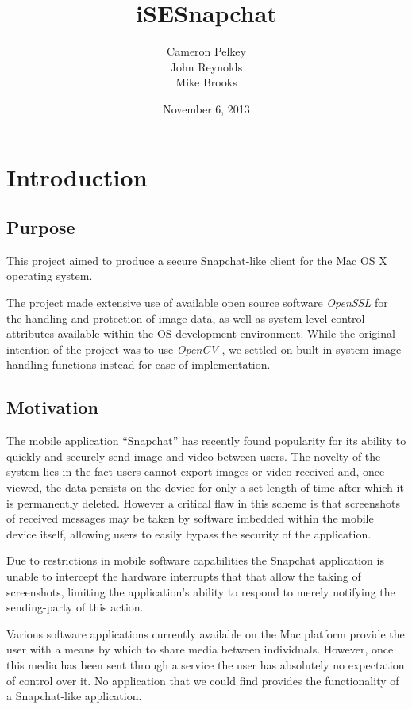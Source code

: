 \documentclass[11pt, a4paper,titlepage]{report}
\title{iSESnapchat}
\author{Cameron Pelkey\\John Reynolds\\Mike Brooks}
\date{November 6, 2013}
\begin{document}
\maketitle


\chapter{Introduction}
\section{Purpose}
This project aimed to produce a secure Snapchat-like client for the Mac OS X operating system.

The project made extensive use of available open source software \emph{OpenSSL} \cite{software:openssl} for the handling and protection of image data, as well as system-level control attributes available within the OS development environment. While the original intention of the project was to use \emph{OpenCV} \cite{software:opencv}, we settled on built-in system image-handling functions instead for ease of implementation.

\section{Motivation}
The mobile application ``Snapchat'' has recently found popularity for its ability to quickly and securely send image and video between users. The novelty of the system lies in the fact users cannot export images or video received and, once viewed, the data persists on the device for only a set length of time after which it is permanently deleted. However a critical flaw in this scheme is that screenshots of received messages may be taken by software imbedded within the mobile device itself, allowing users to easily bypass the security of the application.

Due to restrictions in mobile software capabilities the Snapchat application is unable to intercept the hardware interrupts that that allow the taking of screenshots, limiting the application's ability to respond to merely notifying the sending-party of this action.

Various software applications currently available on the Mac platform provide the user with a means by which to share media between individuals. However, once this media has been sent through a service the user has absolutely no expectation of control over it. No application that we could find provides the functionality of a Snapchat-like application.
\end{document}
